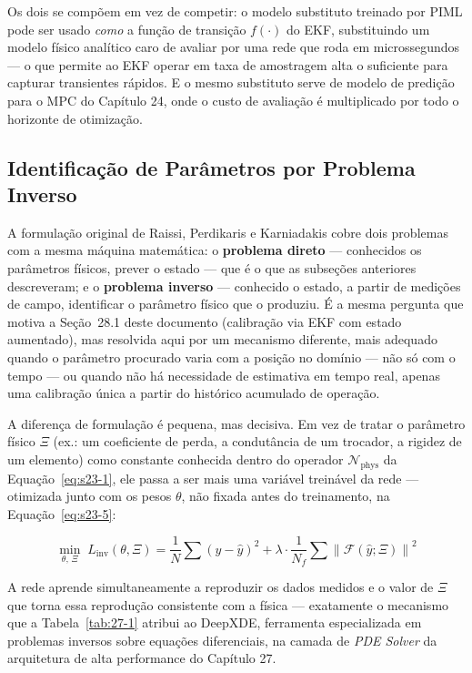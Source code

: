 \documentclass[12pt,a4paper]{article}
\numberwithin{equation}{section}
\numberwithin{table}{section}
\numberwithin{figure}{section}
\begin{document}
	Os dois se compõem em vez de competir: o modelo substituto treinado por PIML pode ser usado \textit{como} a função de transição $f(\cdot)$ do EKF, substituindo um modelo físico analítico caro de avaliar por uma rede que roda em microssegundos — o que permite ao EKF operar em taxa de amostragem alta o suficiente para capturar transientes rápidos. E o mesmo substituto serve de modelo de predição para o MPC do Capítulo 24, onde o custo de avaliação é multiplicado por todo o horizonte de otimização.

	\subsection{Identificação de Parâmetros por Problema Inverso}

	A formulação original de Raissi, Perdikaris e Karniadakis \cite{piml} cobre dois problemas com a mesma máquina matemática: o \textbf{problema direto} — conhecidos os parâmetros físicos, prever o estado — que é o que as subseções anteriores descreveram; e o \textbf{problema inverso} — conhecido o estado, a partir de medições de campo, identificar o parâmetro físico que o produziu. É a mesma pergunta que motiva a Seção~28.1 deste documento (calibração via EKF com estado aumentado), mas resolvida aqui por um mecanismo diferente, mais adequado quando o parâmetro procurado varia com a posição no domínio — não só com o tempo — ou quando não há necessidade de estimativa em tempo real, apenas uma calibração única a partir do histórico acumulado de operação.

	A diferença de formulação é pequena, mas decisiva. Em vez de tratar o parâmetro físico $\Xi$ (ex.: um coeficiente de perda, a condutância de um trocador, a rigidez de um elemento) como constante conhecida dentro do operador $\mathcal{N}_{\text{phys}}$ da Equação~\eqref{eq:s23-1}, ele passa a ser mais uma variável treinável da rede — otimizada junto com os pesos $\theta$, não fixada antes do treinamento, na Equação~\eqref{eq:s23-5}:

	\begin{equation}\label{eq:s23-5}
	\min_{\theta,\, \Xi} \; L_{\text{inv}}(\theta, \Xi) = \frac{1}{N}\sum (y-\hat{y})^2 + \lambda \cdot \frac{1}{N_f}\sum \left\| \mathcal{F}(\hat{y}; \Xi) \right\|^2
	\end{equation}

	A rede aprende simultaneamente a reproduzir os dados medidos e o valor de $\Xi$ que torna essa reprodução consistente com a física — exatamente o mecanismo que a Tabela~\ref{tab:27-1} atribui ao DeepXDE, ferramenta especializada em problemas inversos sobre equações diferenciais, na camada de \textit{PDE Solver} da arquitetura de alta performance do Capítulo 27.
\end{document}
